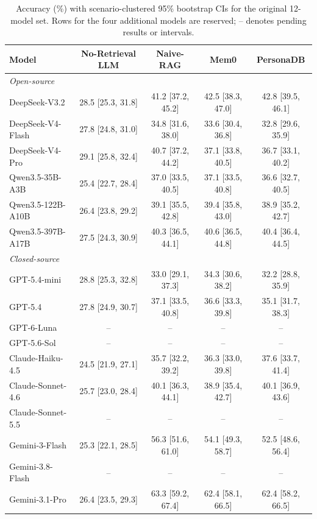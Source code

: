 \documentclass[11pt]{article}
\begin{document}
\begin{table}[t]
\centering
\caption{Accuracy (\%) with scenario-clustered 95\% bootstrap CIs for the original 12-model set. Rows for the four additional models are reserved; -- denotes pending results or intervals.}
\label{tab:accuracy_ci}
\setlength{\tabcolsep}{4.5pt}
\scriptsize
\begin{tabular}{lcccc}
\toprule
\textbf{Model} & \textbf{No-Retrieval LLM} & \textbf{Naive-RAG} & \textbf{Mem0} & \textbf{PersonaDB} \\
\midrule
\multicolumn{5}{l}{\textit{Open-source}} \\
\midrule
DeepSeek-V3.2       & 28.5 [25.3, 31.8] & 41.2 [37.2, 45.2] & 42.5 [38.3, 47.0] & 42.8 [39.5, 46.1] \\
DeepSeek-V4-Flash   & 27.8 [24.8, 31.0] & 34.8 [31.6, 38.0] & 33.6 [30.4, 36.8] & 32.8 [29.6, 35.9] \\
DeepSeek-V4-Pro     & 29.1 [25.8, 32.4] & 40.7 [37.2, 44.2] & 37.1 [33.8, 40.5] & 36.7 [33.1, 40.2] \\
Qwen3.5-35B-A3B     & 25.4 [22.7, 28.4] & 37.0 [33.5, 40.5] & 37.1 [33.5, 40.8] & 36.6 [32.7, 40.5] \\
Qwen3.5-122B-A10B   & 26.4 [23.8, 29.2] & 39.1 [35.5, 42.8] & 39.4 [35.8, 43.0] & 38.9 [35.2, 42.7] \\
Qwen3.5-397B-A17B   & 27.5 [24.3, 30.9] & 40.3 [36.5, 44.1] & 40.6 [36.5, 44.8] & 40.4 [36.4, 44.5] \\
\midrule
\multicolumn{5}{l}{\textit{Closed-source}} \\
\midrule
GPT-5.4-mini        & 28.8 [25.3, 32.8] & 33.0 [29.1, 37.3] & 34.3 [30.6, 38.2] & 32.2 [28.8, 35.9] \\
GPT-5.4             & 27.8 [24.9, 30.7] & 37.1 [33.5, 40.8] & 36.6 [33.3, 39.8] & 35.1 [31.7, 38.3] \\
GPT-6-Luna              & -- & -- & -- & -- \\
GPT-5.6-Sol             & -- & -- & -- & -- \\
Claude-Haiku-4.5    & 24.5 [21.9, 27.1] & 35.7 [32.2, 39.2] & 36.3 [33.0, 39.8] & 37.6 [33.7, 41.4] \\
Claude-Sonnet-4.6   & 25.7 [23.0, 28.4] & 40.1 [36.3, 44.1] & 38.9 [35.4, 42.7] & 40.1 [36.9, 43.6] \\
Claude-Sonnet-5.5       & -- & -- & -- & -- \\
Gemini-3-Flash      & 25.3 [22.1, 28.5] & 56.3 [51.6, 61.0] & 54.1 [49.3, 58.7] & 52.5 [48.6, 56.4] \\
Gemini-3.8-Flash        & -- & -- & -- & -- \\
Gemini-3.1-Pro      & 26.4 [23.5, 29.3] & 63.3 [59.2, 67.4] & 62.4 [58.1, 66.5] & 62.4 [58.2, 66.5] \\
\bottomrule
\end{tabular}
\end{table}
\end{document}
